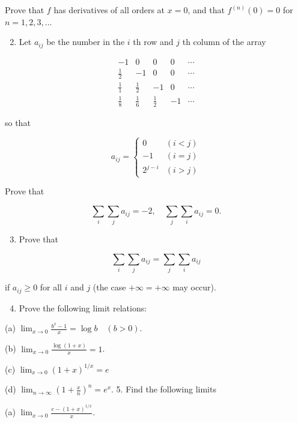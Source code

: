 \documentclass[10pt]{article}
\begin{document}
Prove that $f$ has derivatives of all orders at $x=0$, and that $f^{(n)}(0)=0$ for $n=1,2,3, \ldots$

\begin{enumerate}
  \setcounter{enumi}{1}
  \item Let $a_{i j}$ be the number in the $i$ th row and $j$ th column of the array
\end{enumerate}

$$
\begin{array}{rrrrr}
-1 & 0 & 0 & 0 & \cdots \\
\frac{1}{2} & -1 & 0 & 0 & \cdots \\
\frac{1}{1} & \frac{1}{2} & -1 & 0 & \cdots \\
\frac{1}{8} & \frac{1}{6} & \frac{1}{2} & -1 & \cdots
\end{array}
$$

so that

$$
a_{i j}= \begin{cases}0 & (i<j) \\ -1 & (i=j) \\ 2^{j-i} & (i>j)\end{cases}
$$

Prove that

$$
\sum_{i} \sum_{j} a_{i j}=-2, \quad \sum_{j} \sum_{i} a_{i j}=0 .
$$

\begin{enumerate}
  \setcounter{enumi}{2}
  \item Prove that
\end{enumerate}

$$
\sum_{i} \sum_{j} a_{i j}=\sum_{j} \sum_{i} a_{i j}
$$

if $a_{i j} \geq 0$ for all $i$ and $j$ (the case $+\infty=+\infty$ may occur).

\begin{enumerate}
  \setcounter{enumi}{3}
  \item Prove the following limit relations:
\end{enumerate}

(a) $\lim _{x \rightarrow 0} \frac{b^{x}-1}{x}=\log b \quad(b>0)$.

(b) $\lim _{x \rightarrow 0} \frac{\log (1+x)}{x}=1$.

(c) $\lim _{x \rightarrow 0}(1+x)^{1 / x}=e$

(d) $\lim _{n \rightarrow \infty}\left(1+\frac{x}{n}\right)^{n}=e^{x}$. 5. Find the following limits

(a) $\lim _{x \rightarrow 0} \frac{e-(1+x)^{1 / x}}{x}$.
\end{document}
